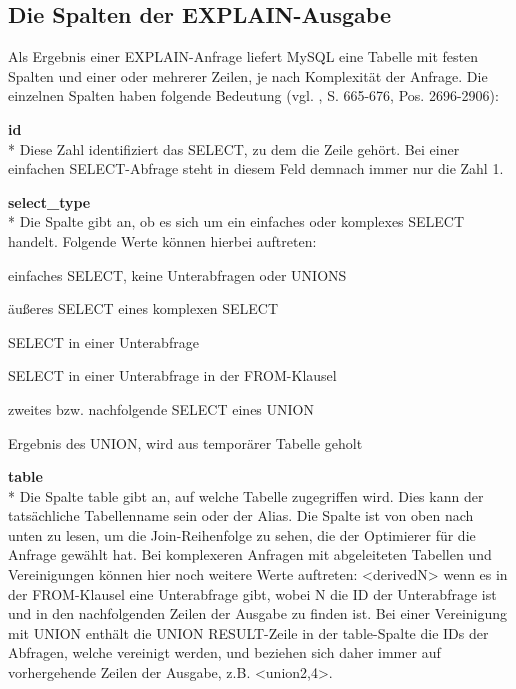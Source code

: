 \subsection{Die Spalten der EXPLAIN-Ausgabe}
Als Ergebnis einer EXPLAIN-Anfrage liefert MySQL eine Tabelle mit festen Spalten und einer oder mehrerer Zeilen, je nach Komplexität der Anfrage. Die einzelnen Spalten haben folgende Bedeutung (vgl. \cite{refman2}, 
\cite{Schwartz2009} S. 665-676, 
\cite{Bradford2011} Pos. 2696-2906):

\textbf{id}\\*
Diese Zahl identifiziert das SELECT, zu dem die Zeile gehört. Bei einer einfachen SELECT-Abfrage steht in diesem Feld demnach immer nur die Zahl 1.

\textbf{select\_type}\\*
Die Spalte gibt an, ob es sich um ein einfaches oder komplexes SELECT handelt. Folgende Werte können hierbei auftreten:
\begin{description}[labelwidth=100pt]
	\item[SIMPLE] einfaches SELECT, keine Unterabfragen oder UNIONS
	\item[PRIMARY] äußeres SELECT eines komplexen SELECT
	\item[SUBQUERY] SELECT in einer Unterabfrage
	\item[DERIVED] SELECT in einer Unterabfrage in der FROM-Klausel
	\item[UNION] zweites bzw. nachfolgende SELECT eines UNION
	\item[UNION RESULT] Ergebnis des UNION, wird aus temporärer Tabelle geholt
\end{description}

\textbf{table}\\*
Die Spalte table gibt an, auf welche Tabelle zugegriffen wird. Dies kann der tatsächliche Tabellenname sein oder der Alias. Die Spalte ist von oben nach unten zu lesen, um die Join-Reihenfolge zu sehen, die der Optimierer für die Anfrage gewählt hat.
Bei komplexeren Anfragen mit abgeleiteten Tabellen und Vereinigungen können hier noch weitere Werte auftreten: <derivedN> wenn es in der FROM-Klausel eine Unterabfrage gibt, wobei N die ID der Unterabfrage ist und in den nachfolgenden Zeilen der Ausgabe zu finden ist. Bei einer Vereinigung mit UNION enthält die UNION RESULT-Zeile in der table-Spalte die IDs der Abfragen, welche vereinigt werden, und beziehen sich daher immer auf vorhergehende Zeilen der Ausgabe, z.B. <union2,4>.

